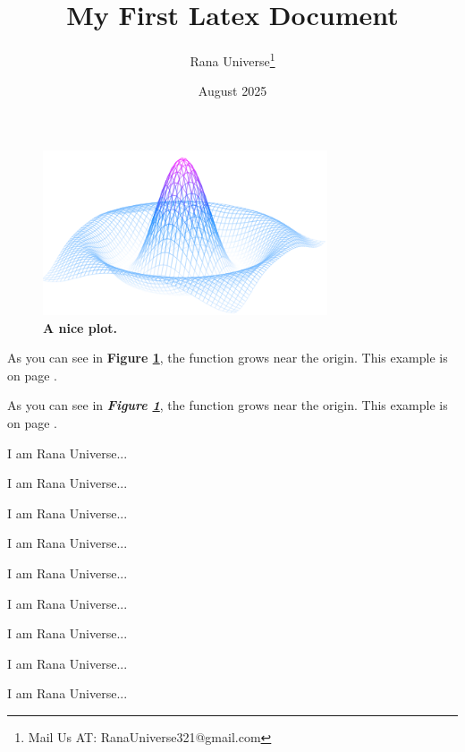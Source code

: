 \documentclass[12pt, letterpaper]{article}
\title{My First Latex Document}
\author{Rana Universe\thanks{Mail Us AT: RanaUniverse321@gmail.com}}
\date{August 2025}
\begin{document}
\maketitle








\begin{figure}[h]   %
    \centering   %
    \includegraphics[width=0.75\textwidth]{mesh.png}    %
    \caption{\textbf{A nice plot.}}   
    \label{fig:mesh1}   %
\end{figure}

As you can see in \textbf{Figure \ref{fig:mesh1}}, the function grows near the origin. This example is on page \pageref{fig:mesh1}.


As you can see in \textbf{\textit{Figure \ref{fig:mesh1}}}, the function grows near the origin. This example is on page \pageref{fig:mesh1}.





\vspace{10em}

I am Rana Universe...

I am Rana Universe...

I am Rana Universe...

I am Rana Universe...

I am Rana Universe...

I am Rana Universe...

I am Rana Universe...

I am Rana Universe...

I am Rana Universe...

\vspace{3em}





\lipsum[1]

\lipsum[2]

\vspace{1em}

\lipsum[1]




\end{document}
